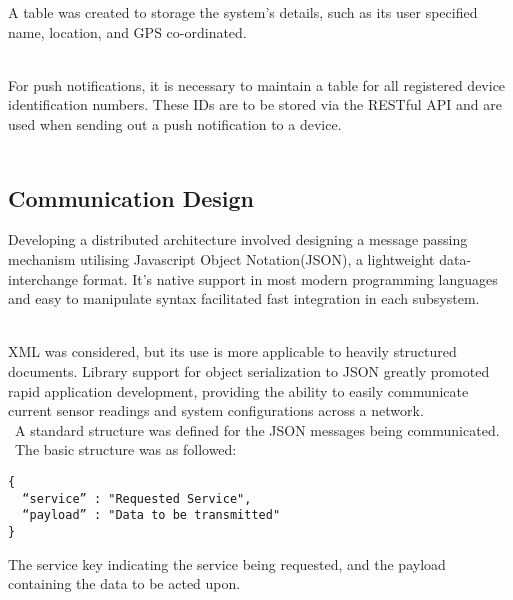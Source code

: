 \documentclass{article}
\begin{document}
A table was created to storage the system’s details, such as its user specified name, location, and GPS co-ordinated. \\\

For push notifications, it is necessary to maintain a table for all registered device identification numbers. These IDs are to be stored via the RESTful API and are used when sending out a push notification to a device. \\\

\subsection{Communication Design}
Developing a distributed architecture involved designing a message passing mechanism utilising Javascript Object Notation(JSON), a lightweight data-interchange format. It’s native support in most modern programming languages and easy to manipulate syntax facilitated fast integration in each subsystem. \\\

XML was considered, but its use is more applicable to heavily structured documents.  Library support for object serialization to JSON greatly promoted rapid application development, providing the ability to easily communicate current sensor readings and system configurations across a network. \\\ A standard structure was defined for the JSON messages being communicated. \\\ The basic structure was as followed: 
\begin{lstlisting}
{ 
  “service” : "Requested Service",
  “payload” : "Data to be transmitted"
}
\end{lstlisting}

The service key indicating the service being requested, and the payload containing the data to be acted upon.
\end{document}
